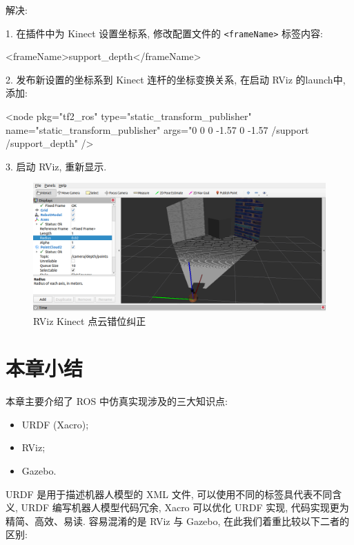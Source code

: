 \documentclass[openany, fontset=windowsold]{ctexbook}
\theoremstyle{kaiti}
\theoremstyle{normal}
\begin{document}
解决:

1. 在插件中为 Kinect 设置坐标系, 修改配置文件的 \verb|<frameName>| 标签内容: 

\begin{xml}
  <frameName>support_depth</frameName>
\end{xml}

2. 发布新设置的坐标系到 Kinect 连杆的坐标变换关系, 在启动 RViz 的launch中, 添加:

\begin{xml}
  <node pkg="tf2_ros" type="static_transform_publisher" name="static_transform_publisher" args="0 0 0 -1.57 0 -1.57 /support /support_depth" />
\end{xml}

3. 启动 RViz, 重新显示.

\begin{figure}[!ht]
  \centering
  \includegraphics[width=.9\textwidth]{rviz_show_kinect_point_cloud_correct.png}
  \caption{RViz Kinect 点云错位纠正}
  \label{fig:rviz_show_kinect_point_cloud_correct}
\end{figure}

\section{本章小结}

本章主要介绍了 ROS 中仿真实现涉及的三大知识点:

\begin{itemize}
  \item URDF (Xacro);
  \item RViz;
  \item Gazebo.
\end{itemize}

URDF 是用于描述机器人模型的 XML 文件, 可以使用不同的标签具代表不同含义, URDF 编写机器人模型代码冗余, Xacro 可以优化 URDF 实现, 代码实现更为精简、高效、易读. 容易混淆的是 RViz 与 Gazebo, 在此我们着重比较以下二者的区别:
\end{document}
